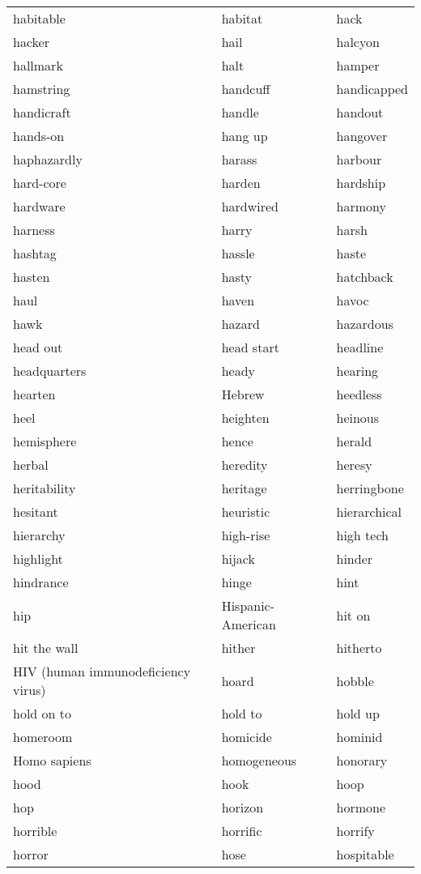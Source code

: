 \documentclass{minimal}
\begin{document}
\begin{longtable}{p{2.8cm}p{2.8cm}p{2.8cm}}
habitable & habitat & hack \\
hacker & hail & halcyon \\
hallmark & halt & hamper \\
hamstring & handcuff & handicapped \\
handicraft & handle & handout \\
hands-on & hang up & hangover \\
haphazardly & harass & harbour \\
hard-core & harden & hardship \\
hardware & hardwired & harmony \\
harness & harry & harsh \\
hashtag & hassle & haste \\
hasten & hasty & hatchback \\
haul & haven & havoc \\
hawk & hazard & hazardous \\
head out & head start & headline \\
headquarters & heady & hearing \\
hearten & Hebrew & heedless \\
heel & heighten & heinous \\
hemisphere & hence & herald \\
herbal & heredity & heresy \\
heritability & heritage & herringbone \\
hesitant & heuristic & hierarchical \\
hierarchy & high-rise & high tech \\
highlight & hijack & hinder \\
hindrance & hinge & hint \\
hip & Hispanic-American & hit on \\
hit the wall & hither & hitherto \\
HIV (human immunodeficiency virus) & hoard & hobble \\
hold on to & hold to & hold up \\
homeroom & homicide & hominid \\
Homo sapiens & homogeneous & honorary \\
hood & hook & hoop \\
hop & horizon & hormone \\
horrible & horrific & horrify \\
horror & hose & hospitable \\

\end{longtable}
\end{document}
